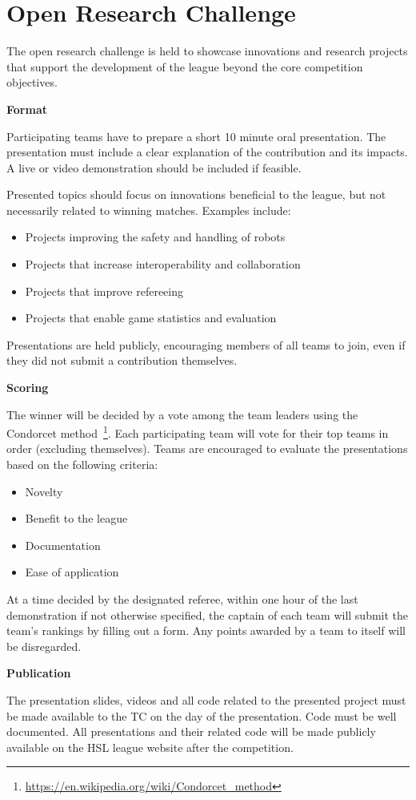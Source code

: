 
\section{Open Research Challenge}
\label{ssec:orc}

The open research challenge is held to showcase innovations and research projects that support the development of the league beyond the core competition objectives. 

\textbf{Format}

Participating teams have to prepare a short 10 minute oral presentation. The presentation must include a clear explanation of the contribution and its impacts. A live or video demonstration should be included if feasible.

Presented topics should focus on innovations beneficial to the league, but not necessarily related to winning matches. Examples include:

\begin{itemize}
\item Projects improving the safety and handling of robots
\item Projects that increase interoperability and collaboration
\item Projects that improve refereeing
\item Projects that enable game statistics and evaluation
\end{itemize}

Presentations are held publicly, encouraging members of all teams to join, even if they did not submit a contribution themselves.

\textbf{Scoring}

The winner will be decided by a vote among the team leaders using the Condorcet method~\footnote{\url{https://en.wikipedia.org/wiki/Condorcet_method}}. Each participating team will vote for their top teams in order (excluding themselves). Teams are encouraged to evaluate the presentations based on the following criteria:

\begin{itemize}
\item Novelty
\item Benefit to the league
\item Documentation
\item Ease of application
\end{itemize}

At a time decided by the designated referee, within one hour of the last demonstration if not otherwise specified, the captain of each team will submit the team’s rankings by filling out a form. Any points awarded by a team to itself will be disregarded.

\textbf{Publication}

The presentation slides, videos and all code related to the presented project must be made available to the TC on the day of the presentation. Code must be well documented. All presentations and their related code will be made publicly available on the HSL league website after the competition.